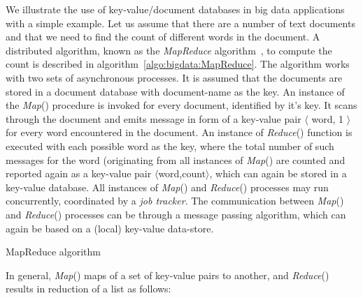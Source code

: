 We illustrate the use of key-value/document databases in big data applications with a simple example. Let us assume that there are a 
number of text documents and that we need to find the count of different words in the document. A distributed algorithm,
known as the {\em MapReduce} algorithm~\citep{Dean:2004}, to compute the count is described in algorithm~\ref{algo:bigdata:MapReduce}.
The algorithm works with two sets of asynchronous processes. It is assumed that the documents are stored in a document database 
with document-name as the key. An instance of the {\em Map}() procedure is invoked for every document, identified by it's key. 
It scans through the document and emits message in form of a key-value pair $\langle$ word, 1 $\rangle$ for every word encountered 
in the document.
An instance of {\em Reduce}() function is executed with each possible word as the key, where the total number of such messages for 
the word (originating from all instances of {\em Map}() are counted and reported again as a key-value pair $\langle$word,count$\rangle$, 
which can again be stored in a key-value database. All instances of {\em Map}() and {\em Reduce}() processes may run concurrently,
coordinated by a {\em job tracker}.
The communication between {\em Map}() and {\em Reduce}() processes can be through a message passing algorithm, which can again
be based on a (local) key-value data-store.

\begin{algorithm}[!htpb]
	\DontPrintSemicolon
	\SetAlgoLined
	\caption{MapReduce algorithm}
	\label{algo:bigdata:MapReduce}
\end{algorithm}

\noindent

In general, {\em Map}() maps of a set of key-value pairs to another, and {\em Reduce}() results 
in reduction of a list as follows:

